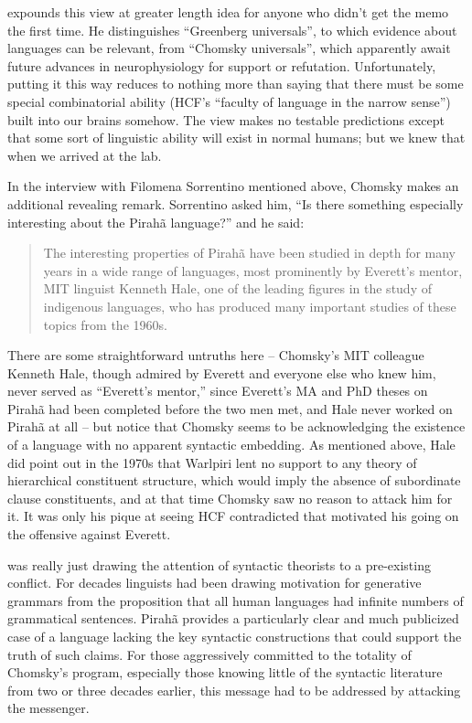 \documentclass[output=paper,colorlinks,citecolor=brown
]{langscibook}
\begin{document}
\citet[792--794]{Hornstein19} expounds this view at
greater length idea for anyone who didn't get the memo the first time.
He distinguishes ``Greenberg universals'', to which evidence about languages
can be relevant, from ``Chomsky universals'', which apparently await future
advances in neurophysiology for support or refutation. Unfortunately,
putting it this way reduces to nothing more than saying that there
must be some special combinatorial ability (HCF's ``faculty of language
in the narrow sense'') built into our brains somehow. The view makes no
testable predictions except that some sort of linguistic ability will
exist in normal humans; but we knew that when we arrived at the lab.

In the interview with Filomena Sorrentino mentioned above, Chomsky makes
an additional revealing remark.  Sorrentino asked him, ``Is there something
especially interesting about the Pirah{\~a} language?'' and he said:
\begin{quote}
The interesting properties of Pirah{\~a} have been studied in depth for
many years in a wide range of languages, most prominently by Everett's
mentor, MIT linguist Kenneth Hale, one of the leading figures in the
study of indigenous languages, who has produced many important studies
of these topics from the 1960s.
\end{quote}
There are some straightforward untruths here -- Chomsky's MIT colleague
Kenneth Hale, though admired by Everett and everyone else who knew him,
never served as ``Everett's mentor,'' since Everett's MA and PhD theses on
Pirah{\~a} had been completed before the two men met, and Hale never
worked on Pirah{\~a} at all -- but notice that Chomsky seems to be
acknowledging the existence of a language with no apparent syntactic
embedding. As mentioned above, Hale did point out in the 1970s that
Warlpiri lent no support to any theory of hierarchical constituent
structure, which would imply the absence of subordinate clause
constituents, and at that time Chomsky saw no reason to attack him
for it. It was only his pique at seeing HCF contradicted that motivated
his going on the offensive against Everett.

\citet{Everett05} was really just drawing the attention of syntactic
theorists to a pre-existing conflict. For decades linguists had been
drawing motivation for generative grammars from the proposition that
all human languages had infinite numbers of grammatical sentences.
Pirah{\~a} provides a particularly clear and much publicized case of
a language lacking the key syntactic constructions that could support
the truth of such claims. For those aggressively committed to the
totality of Chomsky's program, especially those knowing little of the
syntactic literature from two or three decades earlier, this message
had to be addressed by attacking the messenger.
\end{document}
